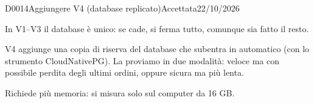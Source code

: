 \begin{decisione}{D0014}{Aggiungere V4 (database replicato)}{Accettata}{22/10/2026}

\contesto
In V1--V3 il database è unico: se cade, si ferma tutto, comunque sia fatto il resto.

\scelta
V4 aggiunge una copia di riserva del database che subentra in automatico (con lo strumento CloudNativePG). La proviamo in due modalità: veloce ma con possibile perdita degli ultimi ordini, oppure sicura ma più lenta.

\conseguenze
Richiede più memoria: si misura solo sul computer da 16 GB.

\end{decisione}
